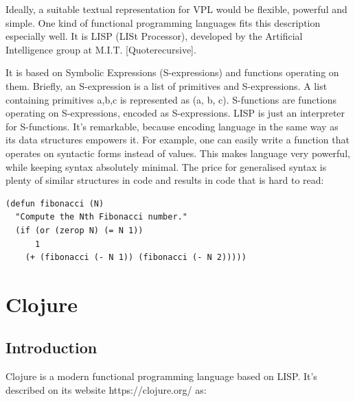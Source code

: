 \documentclass[11pt]{scrartcl}
\begin{document}
Ideally, a suitable textual representation for VPL would be flexible, powerful and simple.
One kind of functional programming languages fits this description especially well. It is LISP (LISt Processor), developed by the Artificial Intelligence group at M.I.T. [Quote{recursive}].

It is based on Symbolic Expressions (S-expressions) and functions operating on them. Briefly, an S-expression is a list of primitives and S-expressions. A list containing primitives a,b,c is represented as (a, b, c). S-functions are functions operating on S-expressions, encoded as S-expressions. LISP is just an interpreter for S-functions. It’s remarkable, because encoding language in the same way as its data structures empowers it. For example, one can easily write a function that operates on syntactic forms instead of values. This makes language very powerful, while keeping syntax absolutely minimal. The price for generalised syntax is plenty of similar structures in code and results in code that is hard to read:
\begin{lstlisting}
(defun fibonacci (N)
  "Compute the Nth Fibonacci number."
  (if (or (zerop N) (= N 1))
      1
    (+ (fibonacci (- N 1)) (fibonacci (- N 2)))))
\end{lstlisting}

\section{Clojure}
\subsection{Introduction}
Clojure is a modern functional programming language based on LISP. It’s described on its website {https://clojure.org/} as:
\end{document}
